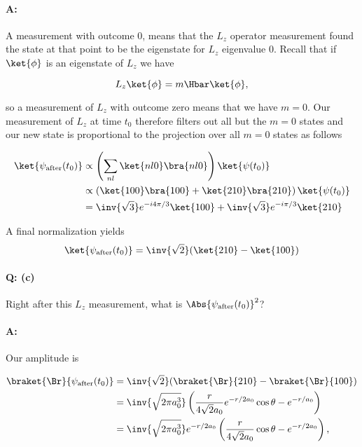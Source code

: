 {\paragraph{A:}

A measurement with outcome 0, means that the \(L_z\) operator measurement found the state at that point to be the eigenstate for \(L_z\) eigenvalue 0.  Recall that  if \(\ket{\phi}\) is an eigenstate of \(L_z\) we have

\begin{equation}\label{eqn:qmIexamPractice2007Dec:4:200}
L_z \ket{\phi} = m \Hbar \ket{\phi},
\end{equation}

so a measurement of \(L_z\) with outcome zero means that we have \(m=0\).  Our measurement of \(L_z\) at time \(t_0\) therefore filters out all but the \(m=0\) states and our new state is proportional to the projection over all \(m=0\) states as follows

\begin{equation}\label{eqn:qmIexamPractice2007Dec:510}
\begin{aligned}
\ket{\psi_{\text{after}}(t_0)}
&\propto \left( \sum_{n l} \ket{n l 0}\bra{n l 0} \right) \ket{\psi(t_0)}  \\
&\propto \left( 
\ket{1 0 0}\bra{1 0 0} 
+\ket{2 1 0}\bra{2 1 0} 
\right) \ket{\psi(t_0)}  \\
&= 
\inv{\sqrt{3}} e^{-i 4 \pi / 3} \ket{100}
+\inv{\sqrt{3}} e^{- i \pi / 3 } \ket{210} 
\end{aligned}
\end{equation}

A final normalization yields
\begin{equation}\label{eqn:qmIexamPractice2007Dec:4:210}
\ket{\psi_{\text{after}}(t_0)}
= \inv{\sqrt{2}} (\ket{210} - \ket{100})
\end{equation}

\paragraph{Q: (c)}

Right after this \(L_z\) measurement, what is \(\Abs{\psi_{\text{after}}(t_0)}^2\)?

\paragraph{A:}

Our amplitude is 

\begin{equation}\label{eqn:qmIexamPractice2007Dec:530}
\begin{aligned}
\braket{\Br}{\psi_{\text{after}}(t_0)}
&= \inv{\sqrt{2}} (\braket{\Br}{210} - \braket{\Br}{100}) \\
&= \inv{\sqrt{2 \pi a_0^3}}
\left(
\frac{r}{4\sqrt{2} a_0} e^{-r/2a_0} \cos\theta
-e^{-r/a_0}
\right) \\
&= \inv{\sqrt{2 \pi a_0^3}}
e^{-r/2 a_0} 
\left(
\frac{r}{4\sqrt{2} a_0} \cos\theta
-e^{-r/2 a_0}
\right),
\end{aligned}
\end{equation}

}
